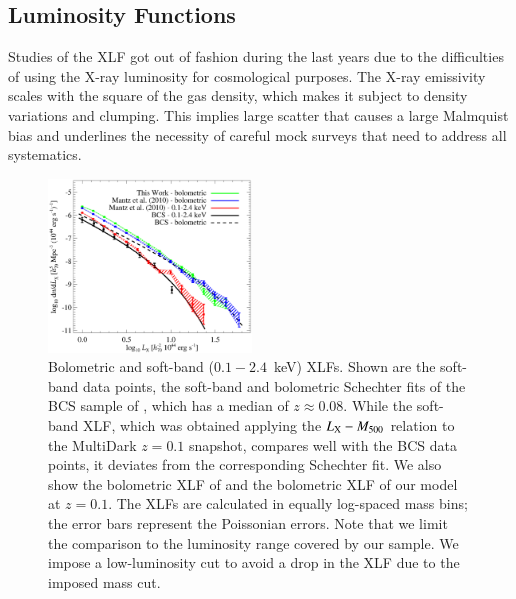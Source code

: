 \documentclass[useAMS,usenatbib]{mn2e}
\begin{document}
\subsection{Luminosity Functions}
Studies of the XLF got out of fashion during the last years due to the
difficulties of using the X-ray luminosity for cosmological purposes. The X-ray
emissivity scales with the square of the gas density, which makes it subject to
density variations and clumping. This implies large scatter that causes a
large Malmquist bias and underlines the necessity of careful mock surveys that
need to address all systematics.

\begin{figure} 
\centering
\includegraphics[width=0.48\textwidth]{figures/xlf.eps}
\caption{Bolometric and soft-band ($0.1-2.4$~keV) XLFs. Shown are the soft-band
  data points, the soft-band and bolometric Schechter fits of the BCS sample of
  \protect\cite{1997ApJ...479L.101E}, which has a median of $z \approx 0.08$.
  While the soft-band XLF, which was obtained applying the
  \protect\cite{2010MNRAS.406.1773M} $L_{{\mathrm{X}}}-M_{500}$ relation to the
  MultiDark $z = 0.1$ snapshot, compares well with the BCS data points, it
  deviates from the corresponding Schechter fit. We also show the bolometric XLF
  of \protect\cite{2010MNRAS.406.1773M} and the bolometric XLF of our model at
  $z=0.1$. The XLFs are calculated in equally log-spaced mass bins; the error
  bars represent the Poissonian errors. Note that we limit the comparison to the
  luminosity range covered by our sample.  We impose a low-luminosity cut to
  avoid a drop in the XLF due to the imposed mass cut.}
\label{fig:XLF}
\end{figure}
\end{document}
